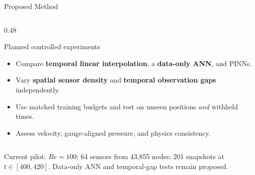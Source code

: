 \documentclass[12pt]{beamer}
\begin{document}
\begin{frame}{Proposed Method}
\begin{columns}[T,onlytextwidth]
\begin{column}{0.48\textwidth}
\begin{block}{Planned controlled experiments}
\begin{itemize}
        \item Compare \textbf{temporal linear interpolation}, a \textbf{data-only ANN}, and PINNs.

        \item Vary \textbf{spatial sensor density} and \textbf{temporal observation gaps} independently.

        \item Use matched training budgets and test on unseen positions \emph{and} withheld times.

        \item Assess velocity, gauge-aligned pressure, and physics consistency.

      \end{itemize}

    \end{block}

  \end{column}

\end{columns}

\vspace{0.2cm}

{\footnotesize\color{steel}Current pilot: $Re=100$; 64 sensors from 43,855 nodes; 201 snapshots at $t\in[400,420]$. Data-only ANN and temporal-gap tests remain proposed.}

\end{frame}

\end{document}
